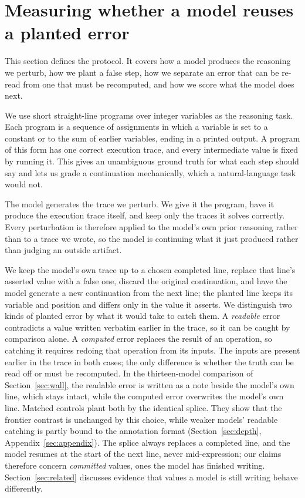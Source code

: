 \section{Measuring whether a model reuses a planted error}
\label{sec:setup}

This section defines the protocol. It covers how a model produces the reasoning we perturb, how we plant a false step, how we separate an error that can be re-read from one that must be recomputed, and how we score what the model does next.

We use short straight-line programs over integer variables as the reasoning task. Each program is a sequence of assignments in which a variable is set to a constant or to the sum of earlier variables, ending in a printed output. A program of this form has one correct execution trace, and every intermediate value is fixed by running it. This gives an unambiguous ground truth for what each step should say and lets us grade a continuation mechanically, which a natural-language task would not.

The model generates the trace we perturb. We give it the program, have it produce the execution trace itself, and keep only the traces it solves correctly. Every perturbation is therefore applied to the model's own prior reasoning rather than to a trace we wrote, so the model is continuing what it just produced rather than judging an outside artifact.

We keep the model's own trace up to a chosen completed line, replace that line's asserted value with a false one, discard the original continuation, and have the model generate a new continuation from the next line; the planted line keeps its variable and position and differs only in the value it asserts. We distinguish two kinds of planted error by what it would take to catch them. A \emph{readable} error contradicts a value written verbatim earlier in the trace, so it can be caught by comparison alone. A \emph{computed} error replaces the result of an operation, so catching it requires redoing that operation from its inputs. The inputs are present earlier in the trace in both cases; the only difference is whether the truth can be read off or must be recomputed. In the thirteen-model comparison of Section~\ref{sec:wall}, the readable error is written as a note beside the model's own line, which stays intact, while the computed error overwrites the model's own line. Matched controls plant both by the identical splice. They show that the frontier contrast is unchanged by this choice, while weaker models' readable catching is partly bound to the annotation format (Section~\ref{sec:depth}, Appendix~\ref{sec:appendix}). The splice always replaces a completed line, and the model resumes at the start of the next line, never mid-expression; our claims therefore concern \emph{committed} values, ones the model has finished writing. Section~\ref{sec:related} discusses evidence that values a model is still writing behave differently.

